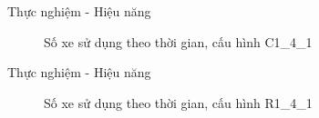 \begin{frame}{Thực nghiệm - Hiệu năng}
  \begin{figure}
    \centering
    \quad
  \caption{Số xe sử dụng theo thời gian, cấu hình C1\_4\_1}
  \end{figure}
\end{frame}

\begin{frame}{Thực nghiệm - Hiệu năng}
  \begin{figure}
    \centering
    \quad
  \caption{Số xe sử dụng theo thời gian, cấu hình R1\_4\_1}
  \end{figure}
\end{frame}

